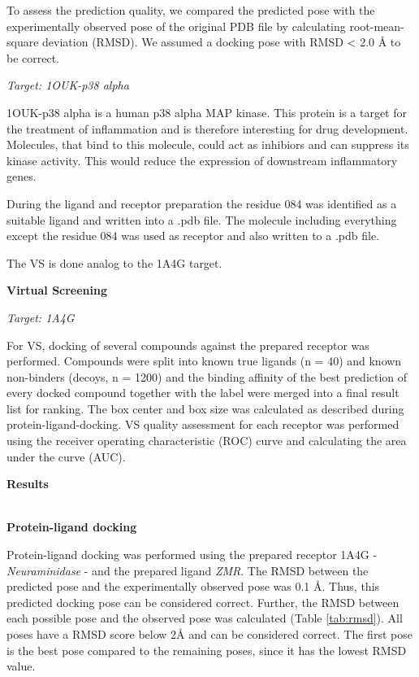 \documentclass[a4paper,10pt]{article}
\begin{document}
To assess the prediction quality, we compared the predicted pose with the experimentally observed pose of the original PDB file by calculating root-mean-square deviation (RMSD). We assumed a docking pose with RMSD < 2.0 Å to be correct.

\textit{Target: 1OUK-p38 alpha}

1OUK-p38 alpha is  a human p38 alpha MAP kinase. This protein is a target for the treatment of inflammation and is therefore interesting for drug development. Molecules, that bind to this molecule, could act as inhibiors and can suppress its kinase activity. This would reduce the expression of downstream inflammatory genes. \cite{1OUK}

During the ligand and receptor preparation the residue 084 was identified as a suitable ligand and written into a .pdb file. The molecule including everything except the residue 084 was used as receptor and also written to a .pdb file. 

The VS is done analog to the 1A4G target.

\textbf{Virtual Screening}

\textit{Target: 1A4G}

For VS, docking of several compounds against the prepared receptor was performed. Compounds were split into known true ligands (n = 40) and known non-binders (decoys, n = 1200) and the binding affinity of the best prediction of every docked compound together with the label were merged into a final result list for ranking. The box center and box size was calculated as described during protein-ligand-docking.
VS quality assessment for each receptor was performed using the receiver operating characteristic (ROC) curve and calculating the area under the curve (AUC).


\begin{large}
	\vspace{0.5cm}
	\textbf{Results}
\end{large}	\\ [1mm]

\textbf{Protein-ligand docking}

Protein-ligand docking was performed using the prepared receptor 1A4G - \textit{Neuraminidase} - and the prepared ligand \textit{ZMR}. The RMSD between the predicted pose and the experimentally observed pose was 0.1 Å. Thus, this predicted docking pose can be considered correct. Further, the RMSD between each possible pose and the observed pose was calculated (Table \ref{tab:rmsd}). All poses have a RMSD score below 2Å and can be considered correct. The first pose is the best pose compared to the remaining poses, since it has the lowest RMSD value.
\end{document}
